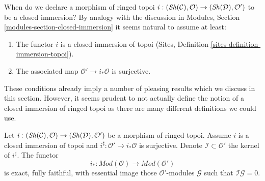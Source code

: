 \noindent
When do we declare a morphism of ringed topoi
$i : (\mathop{\mathit{Sh}}\nolimits(\mathcal{C}), \mathcal{O}) \to (\mathop{\mathit{Sh}}\nolimits(\mathcal{D}), \mathcal{O}')$
to be a closed immersion? By analogy with the discussion in
Modules, Section \ref{modules-section-closed-immersion}
it seems natural to assume at least:
\begin{enumerate}
\item The functor $i$ is a closed immersion of topoi
(Sites, Definition \ref{sites-definition-immersion-topoi}).
\item The associated map $\mathcal{O}' \to i_*\mathcal{O}$ is surjective.
\end{enumerate}
These conditions already imply a number of pleasing results which we discuss
in this section. However, it seems prudent to not actually define the
notion of a closed immersion of ringed topoi as there are many different
definitions we could use.

\begin{lemma}
\label{lemma-i-star-equivalence}
Let $i : (\mathop{\mathit{Sh}}\nolimits(\mathcal{C}), \mathcal{O}) \to (\mathop{\mathit{Sh}}\nolimits(\mathcal{D}), \mathcal{O}')$
be a morphism of ringed topoi. Assume $i$ is a closed immersion of topoi
and $i^\sharp : \mathcal{O}' \to i_*\mathcal{O}$ is surjective.
Denote $\mathcal{I} \subset \mathcal{O}'$ the kernel of $i^\sharp$.
The functor
$$
i_* :
\textit{Mod}(\mathcal{O})
\longrightarrow
\textit{Mod}(\mathcal{O}')
$$
is exact, fully faithful, with essential image those
$\mathcal{O}'$-modules $\mathcal{G}$ such that $\mathcal{I}\mathcal{G} = 0$.
\end{lemma}

